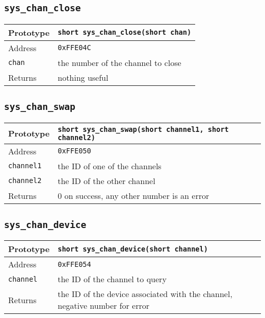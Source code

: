 \subsection*{\texttt{sys\_chan\_close}}
\begin{tabular}{|l||l|} \hline
Prototype & \lstinline!short sys_chan_close(short chan)! \\ \hline
Address & \texttt{0xFFE04C} \\ \hline
\lstinline!chan! & the number of the channel to close \\ \hline
Returns & nothing useful \\ \hline
\end{tabular}

\subsection*{\texttt{sys\_chan\_swap}}
\begin{tabular}{|l||l|} \hline
Prototype & \lstinline!short sys_chan_swap(short channel1, short channel2)! \\ \hline
Address & \texttt{0xFFE050} \\ \hline
\lstinline!channel1! & the ID of one of the channels \\ \hline
\lstinline!channel2! & the ID of the other channel \\ \hline
Returns & 0 on success, any other number is an error \\ \hline
\end{tabular}

\subsection*{\texttt{sys\_chan\_device}}
\begin{tabular}{|l||l|} \hline
Prototype & \lstinline!short sys_chan_device(short channel)! \\ \hline
Address & \texttt{0xFFE054} \\ \hline
\lstinline!channel! & the ID of the channel to query \\ \hline
Returns & the ID of the device associated with the channel, negative number for error \\ \hline
\end{tabular}
